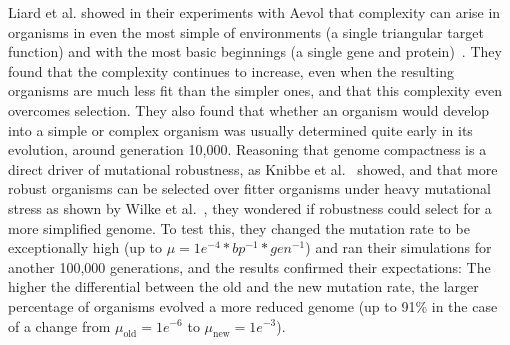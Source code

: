 Liard et al. showed in their experiments with Aevol that complexity can arise in organisms in even the most simple of environments (a single triangular target function) and with the most basic beginnings (a single gene and protein)~\cite{Liard.2018}. They found that the complexity continues to increase, even when the resulting organisms are much less fit than the simpler ones, and that this complexity even overcomes selection. They also found that whether an organism would develop into a simple or complex organism was usually determined quite early in its evolution, around generation 10,000. Reasoning that genome compactness is a direct driver of mutational robustness, as Knibbe et al.~\cite{Knibbe2007} showed, and that more robust organisms can be selected over fitter organisms under heavy mutational stress as shown by Wilke et al.~\cite{wilke2001evolution}, they wondered if robustness could select for a more simplified genome. To test this, they changed the mutation rate to be exceptionally high (up to $\mu = 1e^{-4} *bp^{-1}*gen^{-1}$) and ran their simulations for another 100,000 generations, and the results confirmed their expectations: The higher the differential between the old and the new mutation rate, the larger percentage of organisms evolved a more reduced genome (up to 91\% in the case of a change from $\mu_\text{old}=1e^{-6}$ to $\mu_\text{new}=1e^{-3}$).

